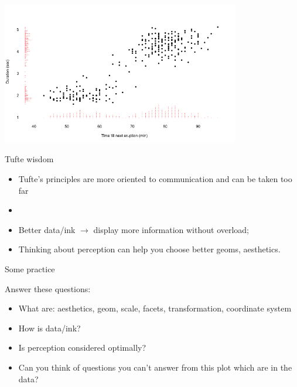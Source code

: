 \documentclass[xcolor=table,aspectratio=169]{beamer}
\begin{document}
\begin{frame}
  \includegraphics[width=0.78\textwidth]{pics/tufte-scatter2.png}
\end{frame}


\begin{frame}{Tufte wisdom}
  \begin{itemize}
  \item Tufte's principles are more oriented to communication and can be taken too far
    \item[]
  \item Better data/ink $\rightarrow$ display more information without overload;
    \item Thinking about perception can help you choose better geoms, aesthetics. 
    
  \end{itemize}
\end{frame}

\begin{frame}
  Some practice
\end{frame}


\begin{frame}Answer these questions:
  \begin{itemize}
  \item What are: aesthetics, geom, scale, facets, transformation, coordinate system
  \item How is data/ink?
  \item Is perception considered optimally?
   \item Can you think of questions you can't answer from this plot which are in the data?
  \end{itemize}
\end{frame}
\end{document}
